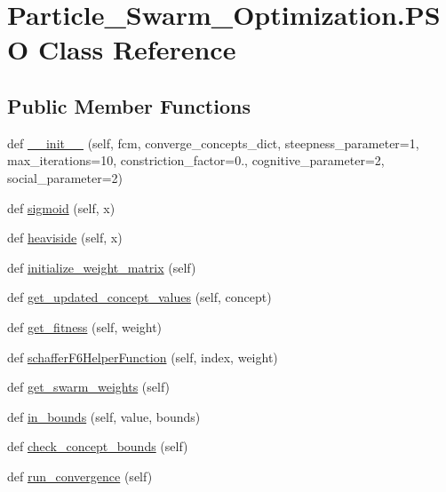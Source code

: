 \hypertarget{class_particle___swarm___optimization_1_1_p_s_o}{}\section{Particle\+\_\+\+Swarm\+\_\+\+Optimization.\+P\+SO Class Reference}
\label{class_particle___swarm___optimization_1_1_p_s_o}
\subsection*{Public Member Functions}
\begin{DoxyCompactItemize}
\item 
def \hyperlink{class_particle___swarm___optimization_1_1_p_s_o_add702c734a63162dbe1cbfd6f94f26f7}{\+\_\+\+\_\+init\+\_\+\+\_\+} (self, fcm, converge\+\_\+concepts\+\_\+dict, steepness\+\_\+parameter=1, max\+\_\+iterations=10, constriction\+\_\+factor=0., cognitive\+\_\+parameter=2, social\+\_\+parameter=2)
\item 
def \hyperlink{class_particle___swarm___optimization_1_1_p_s_o_a8cfda07a7b320a55112993aea3a1f921}{sigmoid} (self, x)
\item 
def \hyperlink{class_particle___swarm___optimization_1_1_p_s_o_a923072a9af1fea8affadfd0bd1a947cf}{heaviside} (self, x)
\item 
def \hyperlink{class_particle___swarm___optimization_1_1_p_s_o_a88adc64e6121ec070e2736145edabd4c}{initialize\+\_\+weight\+\_\+matrix} (self)
\item 
def \hyperlink{class_particle___swarm___optimization_1_1_p_s_o_abf63d69aa42e75058a939c6dac4416c5}{get\+\_\+updated\+\_\+concept\+\_\+values} (self, concept)
\item 
def \hyperlink{class_particle___swarm___optimization_1_1_p_s_o_aadc88450078ac4c483d890a87dee9b0e}{get\+\_\+fitness} (self, weight)
\item 
def \hyperlink{class_particle___swarm___optimization_1_1_p_s_o_a950b777176b42eb5b488c1b822cd0275}{schaffer\+F6\+Helper\+Function} (self, index, weight)
\item 
def \hyperlink{class_particle___swarm___optimization_1_1_p_s_o_aba0d1ce14ce74445ee798358d5475559}{get\+\_\+swarm\+\_\+weights} (self)
\item 
def \hyperlink{class_particle___swarm___optimization_1_1_p_s_o_a810301f0aeba3b2e31dd5c5203b8b201}{in\+\_\+bounds} (self, value, bounds)
\item 
def \hyperlink{class_particle___swarm___optimization_1_1_p_s_o_a26c6af0753a8c0508b2f3d1a727537a7}{check\+\_\+concept\+\_\+bounds} (self)
\item 
def \hyperlink{class_particle___swarm___optimization_1_1_p_s_o_a9a1612724d06d65b4046b5ff26cb9cef}{run\+\_\+convergence} (self)
\end{DoxyCompactItemize}
